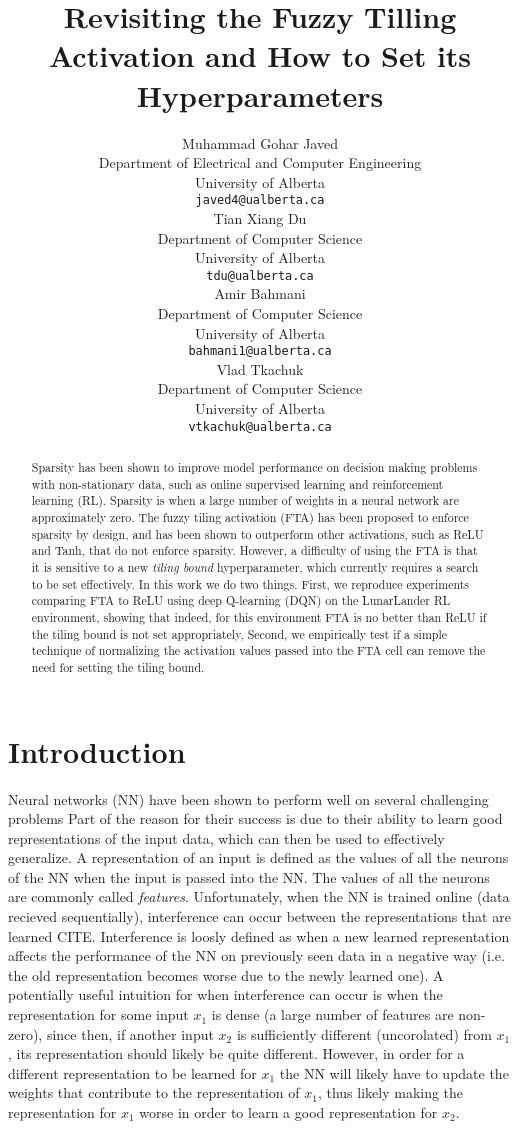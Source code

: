 \documentclass{article}
\title{Revisiting the Fuzzy Tilling Activation and How to Set its Hyperparameters}
\author{%
  Muhammad Gohar Javed \\
  Department of Electrical and Computer Engineering \\
  University of Alberta\\
  \texttt{javed4@ualberta.ca} \\
  \And
  Tian Xiang Du \\
  Department of Computer Science\\
  University of Alberta\\
  \texttt{tdu@ualberta.ca} \\
  \AND
  Amir Bahmani \\
  Department of Computer Science\\
  University of Alberta\\
  \texttt{bahmani1@ualberta.ca} \\
  \And
  Vlad Tkachuk \\
  Department of Computer Science\\
  University of Alberta\\
  \texttt{vtkachuk@ualberta.ca} \\
}
\begin{document}
\maketitle


\begin{abstract}
  Sparsity has been shown to improve model performance on decision making problems with non-stationary data, such as online supervised learning and reinforcement learning (RL).
  Sparsity is when a large number of weights in a neural network are approximately zero.
  The fuzzy tiling activation (FTA) has been proposed to enforce sparsity by design, and has been shown to outperform other activations, such as ReLU and Tanh, that do not enforce sparsity.
  However, a difficulty of using the FTA is that it is sensitive to a new \textit{tiling bound} hyperparameter, which currently requires a search to be set effectively.
  In this work we do two things. 
  First, we reproduce experiments comparing FTA to ReLU using deep Q-learning (DQN) on the LunarLander RL environment, showing that indeed, for this environment FTA is no better than ReLU if the tiling bound is not set appropriately,
  Second, we empirically test if a simple technique of normalizing the activation values passed into the FTA cell can remove the need for setting the tiling bound.


\end{abstract}


\section{Introduction} \label{sec:intro}
Neural networks (NN) have been shown to perform well on several challenging problems \cite{mnih2013playing,silver2017mastering} 
Part of the reason for their success is due to their ability to learn good representations of the input data, which can then be used to effectively generalize.
A representation of an input is defined as the values of all the neurons of the NN when the input is passed into the NN.
The values of all the neurons are commonly called \textit{features}.  
Unfortunately, when the NN is trained online (data recieved sequentially), interference can occur between the representations that are learned CITE.
Interference is loosly defined as when a new learned representation affects the performance of the NN on previously seen data in a negative way (i.e. the old representation becomes worse due to the newly learned one).
A potentially useful intuition for when interference can occur is when the representation for some input $x_1$ is dense (a large number of features are non-zero), 
since then, if another input $x_2$ is sufficiently different (uncorolated) from $x_1$, its representation should likely be quite different.
However, in order for a different representation to be learned for $x_1$ the NN will likely have to update the weights that contribute to the representation of $x_1$, 
thus likely making the representation for $x_1$ worse in order to learn a good representation for $x_2$.
\end{document}
